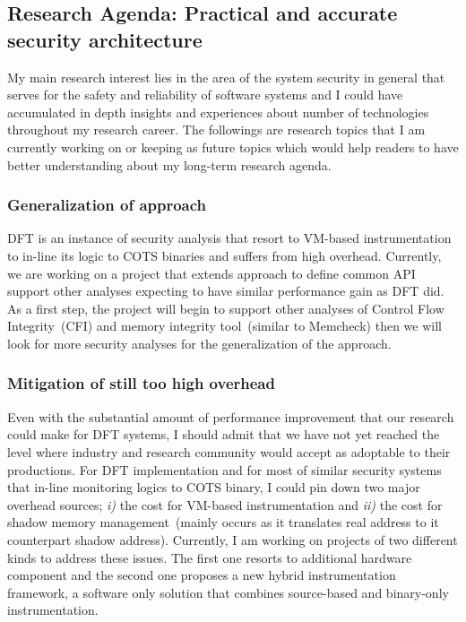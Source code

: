 \documentclass[letterpaper, 10pt]{article}
\begin{document}
\begin{small}
\subsection*{Research Agenda: Practical and accurate security architecture}
%
My main research interest lies in the area of the system security in general
that serves for the safety and reliability of software systems  and I could
have accumulated in depth insights and experiences about number of technologies
throughout my research career.
%
The followings are research topics that I am currently working on or keeping as
future topics which would help readers to have better understanding about my
long-term research agenda.
%
\subsubsection*{Generalization of \SR approach} 
%
DFT is an instance of security analysis that resort to VM-based instrumentation
to in-line its logic to COTS binaries and suffers from high overhead.
%
Currently, we are working on a project that extends \SR approach to define
common API support other analyses expecting to have similar performance gain as
DFT did. 
%
As a first step, the project will begin to support other analyses of Control
Flow Integrity~(CFI) and memory integrity tool~(similar to Memcheck) then we
will look for more security analyses for the generalization of the approach. 
%
\subsubsection*{Mitigation of still too high overhead}
%
Even with the substantial amount of performance improvement that our research
could make for DFT systems, I should admit that we have not yet reached the
level where industry and research community would accept as adoptable to their
productions.
%
For DFT implementation and for most of similar security systems that in-line
monitoring logics to COTS binary, I could pin down two major overhead sources;
{\it i)} the cost for VM-based instrumentation and {\it ii)} the cost for
shadow memory management~(mainly occurs as it translates real address to it
counterpart shadow address).
%
Currently, I am working on projects of two different kinds to address these
issues. The first one resorts to additional hardware component and the second
one proposes a new hybrid instrumentation framework, a software only solution
that combines source-based and binary-only instrumentation.


\end{small}
\end{document}
